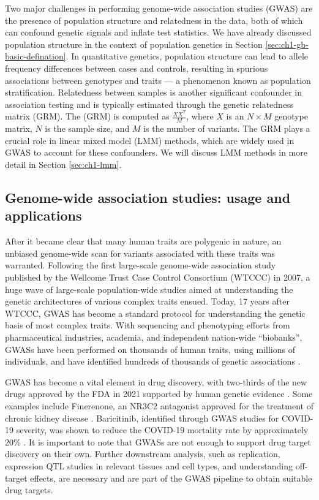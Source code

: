 Two major challenges in performing genome-wide association studies (GWAS) are the presence of population structure and relatedness in the data, both of which can confound genetic signals and inflate test statistics. We have already discussed population structure in the context of population genetics in Section \ref{sec:ch1-gb-basic-defination}. In quantitative genetics, population structure can lead to allele frequency differences between cases and controls, resulting in spurious associations between genotypes and traits — a phenomenon known as population stratification. Relatedness between samples is another significant confounder in association testing and is typically estimated through the genetic relatedness matrix (GRM). The (GRM) is computed as \(\frac{XX^T}{M}\), where \(X\) is an \(N \times M\) genotype matrix, \(N\) is the sample size, and \(M\) is the number of variants. The GRM plays a crucial role in linear mixed model (LMM) methods, which are widely used in GWAS to account for these confounders. We will discuss LMM methods in more detail in Section \ref{sec:ch1-lmm}.


\subsection{Genome-wide association studies: usage and applications}
\label{sec:ch1-qd-gwas-applications}

After it became clear that many human traits are polygenic in nature, an unbiased genome-wide scan for variants associated with these traits was warranted. Following the first large-scale genome-wide association study published by the Wellcome Trust Case Control Consortium (WTCCC) in 2007, a huge wave of large-scale population-wide studies aimed at understanding the genetic architectures of various complex traits ensued. Today, 17 years after WTCCC, GWAS has become a standard protocol for understanding the genetic basis of most complex traits. With sequencing and phenotyping efforts from pharmaceutical industries, academia, and independent nation-wide ``biobanks'', GWASs have been performed on thousands of human traits, using millions of individuals, and have identified hundreds of thousands of genetic associations \cite{GWASCatalog}. %

GWAS has become a vital element in drug discovery, with two-thirds of the new drugs approved by the FDA in 2021 supported by human genetic evidence \cite{rusina2023genetic,ochoa2022human,abdellaoui202315}. Some examples include Finerenone, an NR3C2 antagonist approved for the treatment of chronic kidney disease \cite{teumer2019genome,bakris2020effect}. Baricitinib, identified through GWAS studies for COVID-19 severity, was shown to reduce the COVID-19 mortality rate by approximately 20\% \cite{favalli2020baricitinib,horowitz2022genome}. It is important to note that GWASs are not enough to support drug target discovery on their own. Further downstream analysis, such as replication, expression QTL studies in relevant tissues and cell types, and understanding off-target effects, are necessary and are part of the GWAS pipeline to obtain suitable drug targets.

